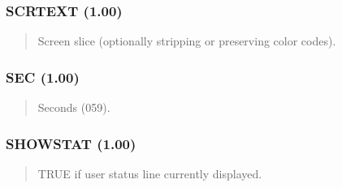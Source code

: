 \documentclass[letterpaper,10pt,english]{sphinxmanual}
\begin{document}
\subsubsection{SCRTEXT (1.00)}
\label{\detokenize{ppl:scrtext-1-00}}\begin{quote}

\sphinxAtStartPar
{}
\begin{description}
\sphinxAtStartPar
Screen slice (optionally stripping or preserving color codes).

\end{description}
\end{quote}


\subsubsection{SEC (1.00)}
\label{\detokenize{ppl:sec-1-00}}\begin{quote}

\sphinxAtStartPar
{}
\begin{description}
\sphinxAtStartPar
Seconds (0\textendash{}59).

\end{description}
\end{quote}


\subsubsection{SHOWSTAT (1.00)}
\label{\detokenize{ppl:showstat-1-00}}\begin{quote}

\sphinxAtStartPar
{}
\begin{description}
\sphinxAtStartPar
TRUE if user status line currently displayed.

\end{description}
\end{quote}
\end{document}
